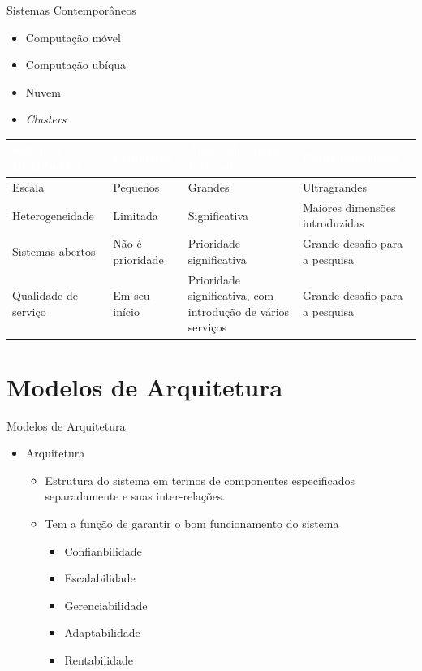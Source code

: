 \documentclass[aspectratio=169,
				xcolor=table]{beamer}
\begin{document}
	\begin{frame}{Sistemas Contemporâneos}
		\begin{itemize}
			\item Computação móvel
			\vspace{1em}
			\item Computação ubíqua
			\vspace{1em}
			\item Nuvem
			\vspace{1em}
			\item \textit{Clusters}
		\end{itemize}
	\end{frame}
	
	\begin{frame}{}
	\begin{eftable}
		\begin{tabular}{|m{2.7cm}|m{2.3cm}|m{4.5cm}|m{3.5cm}|}
			\hline 
			\textcolor{white}{Sistemas Distribuídos} & 
			\textcolor{white}{Primitivos} & 
			\textcolor{white}{Adaptados para Internet} & 
			\textcolor{white}{Contemporâneos}
			 \\ 
			\hline 
			Escala & Pequenos & Grandes 
			 & Ultragrandes \\ 
			\hline 
			Heterogeneidade & Limitada & Significativa 
			 & Maiores dimensões introduzidas
			 \\ 
			\hline 
			Sistemas abertos & Não é prioridade & Prioridade significativa
			 & Grande desafio para a pesquisa
			 \\ 
			\hline 
			Qualidade de serviço & Em seu início
			 & Prioridade significativa, com introdução de vários serviços
			 & Grande desafio para a pesquisa
			 \\ 
			\hline 
		\end{tabular}
	\end{eftable}
	\end{frame}
	\section{Modelos de Arquitetura}	
	\begin{frame}{Modelos de Arquitetura}
		\begin{itemize}
			\item Arquitetura 
			\begin{itemize}
				\item Estrutura do sistema em termos de componentes especificados separadamente e suas inter-relações.
				\item Tem a função de garantir o bom funcionamento do sistema 
				\begin{itemize}
					\item Confianbilidade
					\item Escalabilidade
					\item Gerenciabilidade
					\item Adaptabilidade
					\item Rentabilidade
				\end{itemize}
			\end{itemize}
		\end{itemize}
	\end{frame}
\end{document}
